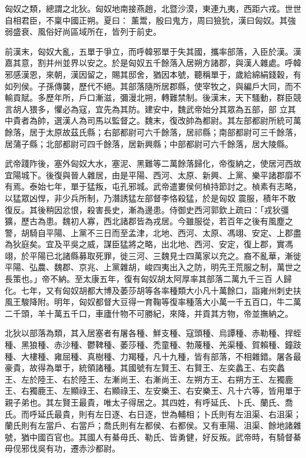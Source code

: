 \begin{pinyinscope}
 匈奴之類，總謂之北狄。匈奴地南接燕趙，北暨沙漠，東連九夷，西距六戎。世世自相君臣，不稟中國正朔。夏曰：
 薰鬻，殷曰鬼方，周曰獫狁，漢曰匈奴。其強弱盛衰、風俗好尚區域所在，皆列于前史。



 前漢末，匈奴大亂，五單于爭立，而呼韓邪單于失其國，攜率部落，入臣於漢。漢嘉其意，割并州並界以安之。於是匈奴五千餘落入居朔方諸郡，與漢人雜處。呼韓邪感漢恩，來朝，漢因留之，賜其邸舍，猶因本號，聽稱單于，歲給綿絹錢穀，有如列侯。子孫傳襲，歷代不絕。其部落隨所居郡縣，使宰牧之，與編戶大同，而不輸貢賦。多歷年所，戶口漸滋，彌漫北朔，轉難禁制。後漢末，天下騷動，群臣競言胡人猥多，懼必為寇，宜先為其防。建安中，魏武帝始分其眾為五部，部
 立其中貴者為帥，選漢人為司馬以監督之。魏末，復改帥為都尉。其左部都尉所統可萬餘落，居于太原故茲氏縣；右部都尉可六千餘落，居祁縣；南部都尉可三千餘落，居蒲子縣；北部都尉可四千餘落，居新興縣；中部都尉可六千餘落，居大陵縣。



 武帝踐阼後，塞外匈奴大水，塞泥、黑難等二萬餘落歸化，帝復納之，使居河西故宜陽城下。後復與晉人雜居，由是平陽、西河、太原、新興、上黨、樂平諸郡靡不有焉。泰始七年，單于猛叛，屯孔邪城。武帝遣婁侯何楨持節討之。楨素有志略，以猛眾凶悍，非少兵所制，乃潛誘猛左部督李恪殺猛，於是匈奴
 震服，積年不敢復反。其後稍因忿恨，殺害長史，漸為邊患。侍御史西河郭欽上疏曰：「戎狄彊獷，歷古為患。魏初人寡，西北諸郡皆為戎居。今雖服從，若百年之後有風塵之警，胡騎自平陽、上黨不三日而至孟津，北地、西河、太原、馮翊、安定、上郡盡為狄庭矣。宜及平吳之威，謀臣猛將之略，出北地、西河、安定，復上郡，實馮翊，於平陽已北諸縣募取死罪，徙三河、三魏見士四萬家以充之。裔不亂華，漸徙平陽、弘農、魏郡、京兆、上黨雜胡，峻四夷出入之防，明先王荒服之制，萬世之長策也。」帝不納。至太康五年，復有匈奴胡太阿厚率其部落二萬九千三百
 人歸化。七年，又有匈奴胡都大博及萎莎胡等各率種類大小凡十萬餘口，詣雍州刺史扶風王駿降附。明年，匈奴都督大豆得一育鞠等復率種落大小萬一千五百口，牛二萬二千頭，羊十萬五千口，車廬什物不可勝紀，來降，并貢其方物，帝並撫納之。



 北狄以部落為類，其入居塞者有屠各種、鮮支種、寇頭種、烏譚種、赤勒種、捍蛭種、黑狼種、赤沙種、鬱鞞種、萎莎種、禿童種、勃蔑種、羌渠種、賀賴種、鐘跂種、大樓種、雍屈種、真樹種、力羯種，凡十九種，皆有部落，不相雜錯。屠各最豪貴，故得為單于，統領諸種。其國號有左賢王、右賢王、左奕蠡王、右奕蠡
 王、左於陸王、右於陸王、左漸尚王、右漸尚王、左朔方王、右朔方王、左獨鹿王、右獨鹿王、左顯祿王、右顯祿王、左安樂王、右安樂王、凡十六等，皆用單于親子弟也。其左賢王最貴，唯太子得居之。其四姓，有呼延氏、卜氏、蘭氏、喬氏。而呼延氏最貴，則有左日逐、右日逐，世為輔相；卜氏則有左沮渠、右沮渠；蘭氏則有左當戶、右當戶；喬氏則有左都侯、右都侯。又有車陽、沮渠、餘地諸雜號，猶中國百官也。其國人有綦毋氏、勒氏、皆勇健，好反叛。武帝時，有騎督綦毋伣邪伐吳有功，遷赤沙都尉。




\end{pinyinscope}
